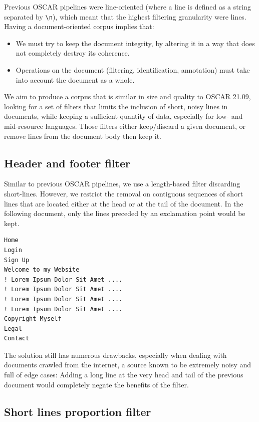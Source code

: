 Previous OSCAR pipelines were line-oriented (where a line is defined as a string separated by \texttt{\textbackslash n}), which meant that the highest filtering granularity were lines.
Having a document-oriented corpus implies that:
\begin{itemize}
    \item We must try to keep the document integrity, by altering it in a way that does not completely destroy its coherence.
    \item Operations on the document (filtering, identification, annotation) must take into account the document as a whole.
\end{itemize}

We aim to produce a corpus that is similar in size and quality to OSCAR 21.09, looking for a set of filters that limits the inclusion of short, noisy lines in documents, while keeping a sufficient quantity of data, especially for low- and mid-resource languages. Those filters either keep/discard a given document, or remove lines from the document body then keep it.

\subsection {Header and footer filter}

Similar to previous OSCAR pipelines, we use a length-based filter discarding short-lines. However, we restrict the removal on contiguous sequences of short lines that are located either at the head or at the tail of the document. In the following document, only the lines preceded by an exclamation point would be kept.

\begin{verbatim}
Home
Login
Sign Up
Welcome to my Website
! Lorem Ipsum Dolor Sit Amet ....
! Lorem Ipsum Dolor Sit Amet ....
! Lorem Ipsum Dolor Sit Amet ....
! Lorem Ipsum Dolor Sit Amet ....
Copyright Myself
Legal
Contact
\end{verbatim}

The solution still has numerous drawbacks, especially when dealing with documents crawled from the internet, a source known to be extremely noisy and full of edge cases: Adding a long line at the very head and tail of the previous document would completely negate the benefits of the filter.

\subsection{Short lines proportion filter}

